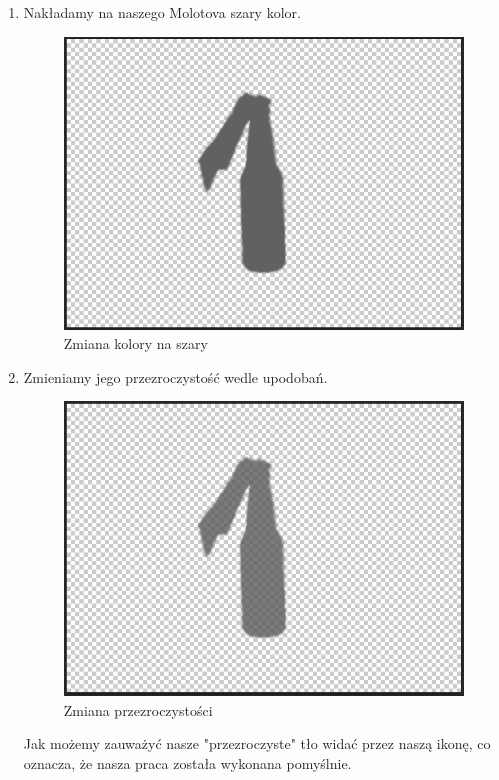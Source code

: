 \begin{enumerate}
  \item Nakładamy na naszego Molotova szary kolor.
\begin{figure}[h]
    \centering
    \includegraphics[scale=0.5]{Images/MolotovOFFgrey.jpg}
    \caption{Zmiana kolory na szary}
    \label{fig:visBuglist}
\end{figure}
\FloatBarrier

  \item Zmieniamy jego przezroczystość wedle upodobań.
\begin{figure}[h]
    \centering
    \includegraphics[scale=0.5]{Images/MolotovOFFgreyOpacity.jpg}
    \caption{Zmiana przezroczystości}
    \label{fig:visBuglist}
\end{figure}
\FloatBarrier
Jak możemy zauważyć nasze "przezroczyste" tło widać przez naszą ikonę, co oznacza, że nasza praca została wykonana pomyślnie.


\end{enumerate}
